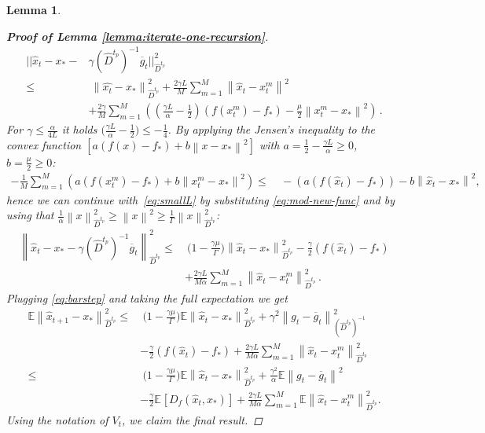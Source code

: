 \documentclass[sn-mathphys,Numbered]{sn-jnl}%
\newtheorem{lemma}{Lemma}%
\newcommand*{\E}{{\mathbb E}}
\renewcommand{\|}{\parallel}
\newcommand\ec[2][]{\ensuremath{\mathbb{E}_{#1} \left[#2\right]}}
\newcommand{\sqn}[1]{{\left\lVert#1\right\rVert}^2}
\renewcommand {\*} {\ast}
\begin{document}
\begin{lemma}
\begin{proof}[\bf Proof of Lemma \ref{lemma:iterate-one-recursion}]
\begin{align}
||\hat{x}_t-x_\ast - &\gamma (\hat{D}^{t_p})^{-1} \overline{g}_t||^2_{\hat{D}^{t_p}} \nonumber \\ \leq&\  \sqn{\hat{x_t}-x_\ast}_{\hat{D}^{t_p}}  + \frac{2 \gamma L}{M} \sum_{m=1}^M  \sqn{\hat{x}_t - x_t^m} \nonumber \\ & \label{eq:smallL} +  \frac{2 \gamma}{M} \sum_{m=1}^M \left(  \left(\frac{\gamma L}{\alpha} -\frac{1}{2}\right)  (f(x_t^m)- f_\ast) - \frac{\mu}{2}\sqn{x_t^m-x_\ast} \right) \,.  
\end{align}
For $\gamma \leq \frac{\alpha}{4L}$ it holds $\bigl(\frac{\gamma L}{\alpha} -\frac{1}{2}\bigr) \leq -\frac{1}{4}$. 
By applying the Jensen's inequality to the convex function $\left[a \left(f(x) - f_\ast\right)+ b \sqn{x- x_\ast }\right]$ with $a = \frac{1}{2} - \frac{\gamma L}{\alpha} \geq 0$, $b = \frac{\mu}{2} \geq 0$:
\begin{align}
\label{eq:mod-new-func}
- \frac{1}{M}\sum_{m=1}^M \left( a (f(x_t^m)- f_\ast) +  b \sqn{x_t^m-x_\ast} \right) \leq&\  -  \left(a (f(\hat{x}_t)- f_\ast)\right) -  b\sqn{\hat{x}_t-x_\ast},
\end{align}
hence we can continue with~\eqref{eq:smallL} by substituting \eqref{eq:mod-new-func} and by using that $\frac{1}{\alpha}\sqn{x}_{\hat{D}^{t_p}} \geq \sqn{x} \geq \frac{1}{\Gamma}\sqn{x}_{\hat{D}^{t_p}}$:
\begin{align}
\sqn{\hat{x}_t-x_\ast - \gamma (\hat{D}^{t_p})^{-1}  \overline{g}_t}_{\hat{D}^{t_p}}  \leq&\  \Big(1-\frac{\gamma\mu}{\Gamma}\Big) \sqn{\hat{x}_t-x_\ast}_{\hat{D}^{t_p}}  -\frac{\gamma}{2}(f(\hat{x}_t)- f_\ast) \nonumber \\ & \label{eq:barstep} + \frac{2 \gamma L}{M\alpha} \sum_{m=1}^M   \sqn{\hat{x}_t - x_t^m}_{\hat{D}^{t_p}}  \,. 
\end{align}
%
Plugging \eqref{eq:barstep} and taking the full expectation we get
\begin{align}
\E \sqn{\hat{x}_{t+1}-x_\ast}_{\hat{D}^{t_p}} \leq&\ \Big(1-\frac{\gamma\mu}{\Gamma}\Big) \E \sqn{\hat{x}_t-x_\ast}_{\hat{D}^{t_p}} + \gamma^2 \sqn{g_t - \overline{g}_t}_{(\hat{D}^{t_p})^{-1}} \nonumber \\ &-\frac{\gamma}{2}(f(\hat{x}_t)- f_\ast)  + \frac{2 \gamma L}{M\alpha} \sum_{m=1}^M   \sqn{\hat{x}_t - x_t^m}_{\hat{D}^{t_p}}\ \nonumber \\ \leq&\ \Big(1-\frac{\gamma\mu}{\Gamma}\Big) \E \sqn{\hat{x}_t-x_\ast}_{\hat{D}^{t_p}} + \frac{\gamma^2}{\alpha}  \E \sqn{g_t - \overline{g}_t} \nonumber \\ &- \frac{\gamma}{2} \ec{D_{f} (\hat{x}_t, x_\ast)} +  \frac{2 \gamma L}{M\alpha} \sum_{m=1}^M \E \sqn{\hat{x}_t - x_t^m}_{\hat{D}^{t_p}}.
\end{align}
Using the notation of $V_t$, we claim the final result.
\end{proof}
\end{lemma}
\end{document}
